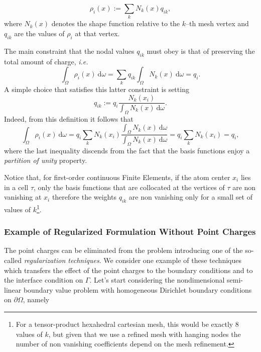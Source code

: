 \documentclass[11pt,a4paper]{article}
\begin{document}
$$
\rho_i(x) := \sum_k N_k(x) q_{ik},
$$
where $ N_k(x) $ denotes the shape function relative to the $k$--th mesh vertex
and $q_{ik}$ are the values of $\rho_i$ at that vertex.

The main constraint that the nodal values $q_{ik}$ must obey is that of preserving
the total amount of charge, {\it i.e.}
$$
\int_\Omega \rho_i(x)\ \mathrm{d}\omega = \sum_k q_{ik}  \int_\Omega N_k(x) \ \mathrm{d}\omega = q_i.
$$
A simple choice that satisfies this latter constraint is setting
$$
q_{ik} := q_i \dfrac{N_k(x_i)}{\int_\Omega N_k(x) \ \mathrm{d}\omega }.
$$
Indeed, from this definition it follows that
$$
\int_\Omega \rho_i(x)\ \mathrm{d}\omega = q_i \displaystyle \sum_k
N_k(x_i) \dfrac{\int_\Omega N_k(x) \ \mathrm{d}\omega}{\int_\Omega N_k(x) \ \mathrm{d}\omega} = q_i \displaystyle \sum_k
N_k(x_i) = q_i,
$$
where the last inequality discends from the fact that the basis functions
enjoy a \emph{partition of unity} property. 

Notice that, for first-order continuous Finite Elements, if the atom center 
$x_i$ lies in a cell $ \tau $, only the basis functions that are collocated
at the vertices of $\tau$ are non vanishing at $x_i$ therefore the weights
$q_{ik}$ are non vanishing only for a small set of values of $k$\footnote{For
a tensor-product hexahedral cartesian mesh, this would be exactly 8 values of $k$,
but given that we use a refined mesh with hanging nodes the number of non vanishing coefficients depend on the mesh refinement.}.
 
 \subsubsection{Example of Regularized Formulation Without Point Charges}
 \label{sec:regularization}
The point charges can be eliminated from the problem introducing one of the so-called \emph{regularization techniques}. We consider one example of these techniques which transfers the effect of the point charges to the boundary conditions and to the interface condition on $\Gamma$.  
Let's start considering the nondimensional semi-linear boundary value problem with homogeneous Dirichlet boundary conditions on $\partial\Omega$, namely
\end{document}
